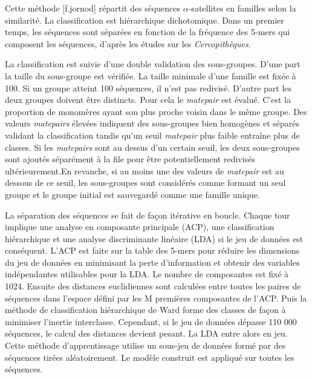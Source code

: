 \documentclass[12pt,a4paper]{article}
\begin{document}

Cette méthode [f.jornod] répartit des séquences $\alpha$-satellites en familles selon la similarité. La classification est hiérarchique dichotomique. Dans un premier temps, les séquences sont séparées en fonction de la fréquence des 5-mers qui composent les séquences, d'après les études sur les \textit{Cercopithèques}.

La classification est suivie d'une double validation des sous-groupes. D'une part la taille du sous-groupe est vérifiée. La taille minimale d'une famille est fixée à 100. Si un groupe atteint 100 séquences, il n'est pas redivisé. D'autre part les deux groupes doivent être distincts. Pour cela le \textit{matepair} est évalué. C'est la proportion de monomères ayant son plus proche voisin dans le même groupe. Des valeurs \textit{matepairs} élevées indiquent des sous-groupes bien homogènes et séparés validant la classification tandis qu’un seuil \textit{matepair} plus faible entraîne plus de classes. Si les \textit{matepairs} sont au dessus d’un certain seuil, les deux sous-groupes sont ajoutés séparément à la file pour être potentiellement redivisés ultérieurement.En revanche, si au moins une des valeurs de \textit{matepair} est au dessous de ce seuil, les sous-groupes sont considérés comme formant un seul groupe et le groupe initial est sauvegardé comme une famille unique. 

La séparation des séquences se fait de façon itérative en boucle. Chaque tour implique une analyse en composante principale (ACP), une classification hiérarchique et une analyse discriminante linéaire (LDA) si le jeu de données est conséquent. L'ACP est faite sur la table des 5-mers pour réduire les dimensions du jeu de données en minimisant la perte d'information et obtenir des variables indépendantes utilisables pour la LDA. Le nombre de composantes est fixé à 1024. Ensuite des distances euclidiennes sont calculées entre toutes les paires de séquences dans l’espace défini par les M premières composantes de l’ACP. Puis la méthode de classification hiérarchique de Ward forme des classes de façon à minimiser l’inertie interclasse. Cependant, si le jeu de données dépasse 110 000 séquences, le calcul des distances devient pesant. La LDA entre alors en jeu. Cette méthode d'apprentissage utilise un sous-jeu de données formé par des séquences tirées aléatoirement. Le modèle construit est appliqué sur toutes les séquences.
\end{document}
